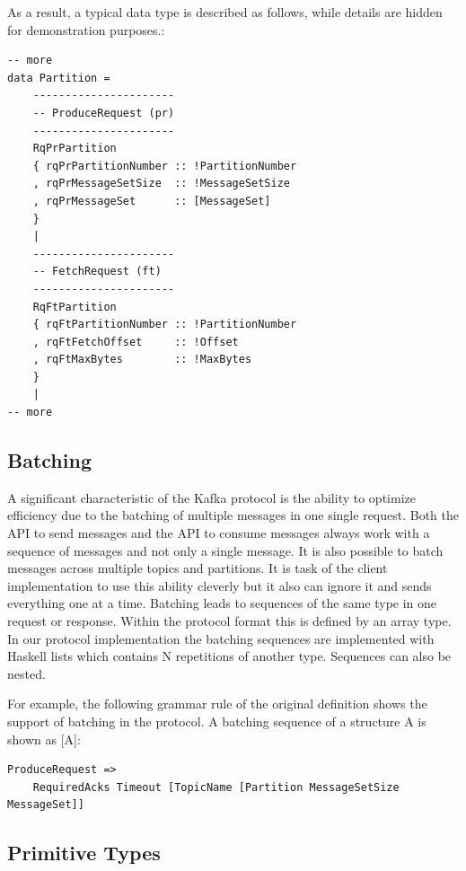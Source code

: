 As a result, a typical data type is described as follows, while details are
hidden for demonstration purposes.:

\begin{lstlisting}[caption={Example of defined protocol types with name
convention}]
-- more
data Partition =
    ----------------------
    -- ProduceRequest (pr)
    ----------------------
    RqPrPartition
    { rqPrPartitionNumber :: !PartitionNumber
    , rqPrMessageSetSize  :: !MessageSetSize
    , rqPrMessageSet      :: [MessageSet]
    }
    |
    ----------------------
    -- FetchRequest (ft)
    ----------------------
    RqFtPartition
    { rqFtPartitionNumber :: !PartitionNumber
    , rqFtFetchOffset     :: !Offset
    , rqFtMaxBytes        :: !MaxBytes
    }
    |
-- more
\end{lstlisting}


\subsection{Batching}
\label{impl-prot-batching}
A significant characteristic of the Kafka protocol is the ability to optimize
efficiency due to the batching of multiple messages in one single request. Both
the API to send messages and the API to consume messages always work with a
sequence of messages and not only a single message. It is also possible to batch
messages across multiple topics and partitions. It is task of the client
implementation to use this ability cleverly but it also can ignore it and sends everything
one at a time. Batching leads to sequences of the same type in one request or response. Within
the protocol format this is defined by an array type. In our protocol
implementation the batching sequences are implemented with Haskell lists which
contains N repetitions of another type. Sequences can also be nested. 

For example, the following grammar rule of the original definition shows the
support of batching in the protocol. A batching sequence of a structure A is
shown as [A]:
\begin{lstlisting}
ProduceRequest => 
    RequiredAcks Timeout [TopicName [Partition MessageSetSize MessageSet]]
\end{lstlisting}

\subsection{Primitive Types}
\label{subsec:protocol-types-primitive}

